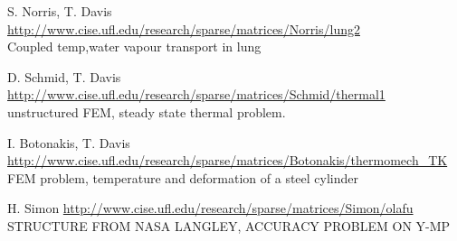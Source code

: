 	{
		{
			S. Norris, T. Davis
		}
		{
			\url{http://www.cise.ufl.edu/research/sparse/matrices/Norris/lung2} \\
			Coupled temp,water vapour transport in lung
		}
	}

	{
		{
			D. Schmid, T. Davis 
		}
		{
			\url{http://www.cise.ufl.edu/research/sparse/matrices/Schmid/thermal1} \\
			unstructured FEM, steady state thermal problem.
		}
	}
	\begin{comment}
	\taskdescription{TS--ST}{\textsc{dc1.mtx}}
	{
		\taskdescfield{Authors}
		{
			T. Lehner, T. Davis 
		}
		\taskdescfield{Description}
		{
			\url{http://www.cise.ufl.edu/research/sparse/matrices/IBM_EDA/dc1} \\
			IBM EDA circuit simulation matrix, Timothy Lehner (DC)
		}
		\taskdescfield{Type}{\textbf{coordinate real general}}
		\taskdescfield{Dimension}{\textbf{116835} x \textbf{116835}}
		\taskdescfield{Non-zeros}{\textbf{766396}}		
	}
	\end{comment}
	{
		{
			I. Botonakis, T. Davis
		}
		{
			\url{http://www.cise.ufl.edu/research/sparse/matrices/Botonakis/thermomech_TK} \\
			FEM problem, temperature and deformation of a steel cylinder
		}
	}

	{
		{
			H. Simon
		}
		{
			\url{http://www.cise.ufl.edu/research/sparse/matrices/Simon/olafu} \\
			STRUCTURE FROM NASA LANGLEY, ACCURACY PROBLEM ON Y-MP
		}
	}

